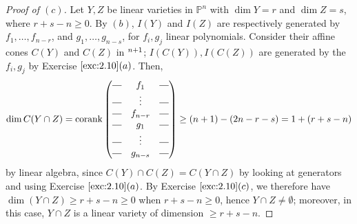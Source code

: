 \documentclass[12pt,letterpaper]{article}
\theoremstyle{definition}
\theoremstyle{remark}
\numberwithin{equation}{section}
\numberwithin{figure}{problem}
\let\AA\relax
\DeclareMathOperator{\AA}{\mathbb{A}}
\newcommand{\PP}{\mathbb{P}}
\begin{document}
\begin{proof}[Proof of $(c)$]
  Let $Y,Z$ be linear varieties in $\PP^n$ with $\dim Y = r$ and $\dim Z = s$,
  where $r+s-n \ge 0$. By $(b)$, $I(Y)$ and $I(Z)$ are respectively generated by
  $f_1,\ldots,f_{n-r}$, and $g_1,\ldots,g_{n-s}$, for $f_i,g_j$ linear polynomials.
  Consider their affine cones $C(Y)$ and $C(Z)$ in
  $\AA^{n+1}$; $I(C(Y)),I(C(Z))$ are generated by the $f_i,g_j$ by
  Exercise $\ref{exc:2.10}(a)$. Then,
  \begin{equation*}
    \dim C(Y \cap Z) = \operatorname{corank} \begin{pmatrix}
      \rule[.5ex]{1em}{0.4pt} & f_1     & \rule[.5ex]{1em}{0.4pt}\\
      \rule[.5ex]{1em}{0.4pt} & \vdots  & \rule[.5ex]{1em}{0.4pt}\\
      \rule[.5ex]{1em}{0.4pt} & f_{n-r} & \rule[.5ex]{1em}{0.4pt}\\
      \rule[.5ex]{1em}{0.4pt} & g_1     & \rule[.5ex]{1em}{0.4pt}\\
      \rule[.5ex]{1em}{0.4pt} & \vdots  & \rule[.5ex]{1em}{0.4pt}\\
      \rule[.5ex]{1em}{0.4pt} & g_{n-s} & \rule[.5ex]{1em}{0.4pt}
    \end{pmatrix} \ge (n+1) - (2n - r - s) = 1 + (r + s - n)
  \end{equation*}
  by linear algebra, since $C(Y) \cap C(Z) = C(Y \cap Z)$ by looking at
  generators and using Exercise $\ref{exc:2.10}(a)$. By Exercise $\ref{exc:2.10}(c)$,
  we therefore have $\dim (Y \cap Z) \ge r + s - n \ge 0$ when $r + s - n \ge 0$,
  hence $Y \cap Z \ne \emptyset$; moreover, in this case, $Y \cap Z$ is a linear
  variety of dimension $\ge r + s - n$.

\end{proof}
\end{document}
